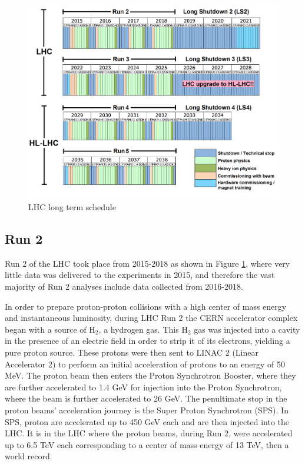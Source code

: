 \begin{figure}[H]
    \centering
    \includegraphics[width=\textwidth]{Images/LHC/LHC_LongTermSchedule_MyVersion.png}
    \caption{LHC long term schedule}
    \label{fig:LHC_Long_Term_Schedule}
\end{figure}

\subsection{Run 2}

Run 2 of the LHC took place from 2015-2018 as shown in Figure \ref{fig:LHC_Long_Term_Schedule}, where very little data was delivered to the experiments in 2015, and therefore the vast majority of Run 2 analyses include data collected from 2016-2018. 

In order to prepare proton-proton collisions with a high center of mass energy and instantaneous luminosity, during LHC Run 2 the CERN accelerator complex began with a source of H$_{2}$, a hydrogen gas. This H$_{2}$ gas was injected into a cavity in the presence of an electric field in order to strip it of its electrons, yielding a pure proton source. These protons were then sent to LINAC 2 (Linear Accelerator 2) to perform an initial acceleration of protons to an energy of 50 MeV. The proton beam then enters the Proton Synchrotron Booster, where they are further accelerated to 1.4 GeV for injection into the Proton Synchrotron, where the beam is further accelerated to 26 GeV. The penultimate stop in the proton beams' acceleration journey is the Super Proton Synchrotron (SPS). In SPS, proton are accelerated up to 450 GeV each and are then injected into the LHC. It is in the LHC where the proton beams, during Run 2, were accelerated up to 6.5 TeV each corresponding to a center of mass energy of 13 TeV, then a world record. 

